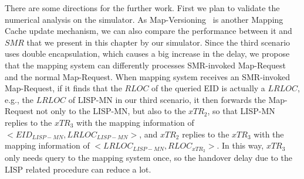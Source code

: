 There are some directions for the further work. First we plan to validate the numerical analysis on the simulator. As Map-Versioning~\cite{rfc6834} is another Mapping Cache update mechanism, we can also compare the performance between it and $SMR$ that we present in this chapter by our simulator. Since the third scenario uses double encapsulation, which causes a big increase in the delay, we propose that the mapping system can differently processes SMR-invoked Map-Request and the normal Map-Request. When mapping system receives an SMR-invoked Map-Request, if it finds that the $RLOC$ of the queried EID is actually a $LRLOC$, e.g., the $LRLOC$ of LISP-MN in our third scenario, it then forwards the Map-Request not only to the LISP-MN, but also to the $xTR_2$, so that LISP-MN replies to the $xTR_3$ with the mapping information of $<EID_{LISP-MN}, LRLOC_{LISP-MN}>$, and $xTR_2$ replies to the $xTR_3$ with the mapping information of $<LRLOC_{LISP-MN}, RLOC_{xTR_2}>$. In this way, $xTR_3$ only needs query to the mapping system once, so the handover delay due to the LISP related procedure can reduce a lot.

